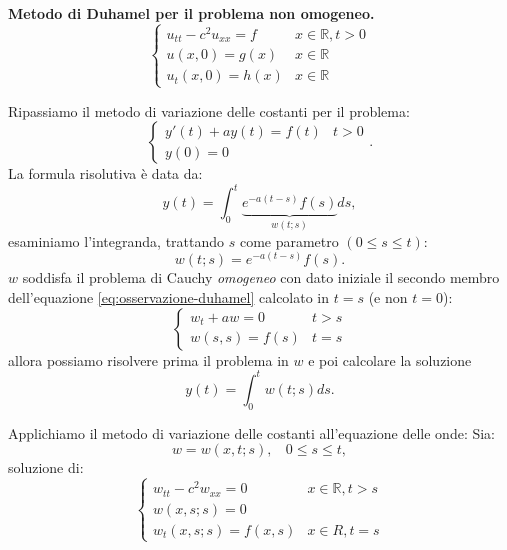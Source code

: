 \documentclass[10pt,a4paper,twoside,openright]{book}
\begin{document}
\textbf{Metodo di Duhamel per il problema non omogeneo.}
\begin{equation}
	\begin{cases}
		u_{tt} -c^{2} u_{xx} =f & x\in \mathbb{R} ,t >0 \\
		u( x,0) =g( x)          & x\in \mathbb{R}       \\
		u_{t}( x,0) =h( x)      & x\in \mathbb{R}       
	\end{cases}
\end{equation}
\begin{oss}
	Ripassiamo il metodo di variazione delle costanti per il problema:
	\begin{equation*}
		\begin{cases}
			y'( t) +ay( t) =f( t) & t >0 \\
			y( 0) =0              &      
		\end{cases} .
	\end{equation*}
	La formula risolutiva è data da:
	\begin{equation*}
		y( t) =\int _{0}^{t}\underbrace{e^{-a( t-s)} f( s)}_{w( t;s)} ds,
	\end{equation*}
	esaminiamo l'integranda, trattando $\displaystyle s$ come parametro $\displaystyle ( 0\leqslant s\leqslant t)$:
	\begin{equation}
		w( t;s) =e^{-a( t-s)} f( s) .
		\label{eq:osservazione-duhamel}
	\end{equation}
	$\displaystyle w$ soddisfa il problema di Cauchy \textit{omogeneo} con dato iniziale il secondo membro dell'equazione \eqref{eq:osservazione-duhamel} calcolato in $\displaystyle t=s$ (e non $\displaystyle t=0$):
	\begin{equation*}
		\begin{cases}
			w_{t} +aw=0    & t >s \\
			w( s,s) =f( s) & t=s  
		\end{cases}
	\end{equation*}
	allora possiamo risolvere prima il problema in $\displaystyle w$ e poi calcolare la soluzione
	\begin{equation*}
		y( t) =\int _{0}^{t} w( t;s) ds.
	\end{equation*}
\end{oss}
Applichiamo il metodo di variazione delle costanti all'equazione delle onde: Sia: 
\begin{equation*}
	w=w( x,t;s) ,\ \ \ \ 0\leqslant s\leqslant t,
\end{equation*}
soluzione di:
\begin{equation*}
	\begin{cases}
		w_{tt} -c^{2} w_{xx} =0 & x\in \mathbb{R} ,t >s \\
		w( x,s;s) =0            &                       \\
		w_{t}( x,s;s) =f( x,s)  & x\in R,t=s            
	\end{cases}
\end{equation*}
\end{document}
